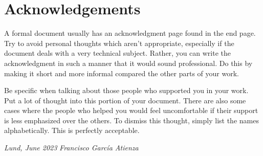 
\chapter*{Acknowledgements}

		


A formal document usually has an acknowledgment page found in the end page. Try to avoid personal thoughts which aren't appropriate, especially if the document deals with a very technical subject. Rather, you can write the acknowledgment in such a manner that it would sound professional. Do this by making it short and more informal compared the other parts of your work.

Be specific when talking about those people who supported you in your work. Put a lot of thought into this portion of your document. There are also some cases where the people who helped you would feel uncomfortable if their support is less emphasized over the others. To dismiss this thought, simply list the names alphabetically. This is perfectly acceptable.

\addvspace{1.3cm}

\textit{Lund, June 2023} \hfill \textit{Francisco García Atienza}









